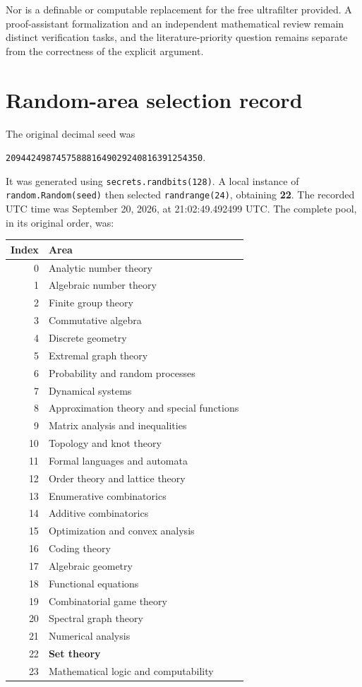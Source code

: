 \documentclass[11pt,a4paper]{article}
\theoremstyle{definition}
\theoremstyle{remark}
\begin{document}
Nor is a definable or computable replacement for the free ultrafilter
provided. A proof-assistant formalization and an independent
mathematical review remain distinct verification tasks, and the
literature-priority question remains separate from the correctness of
the explicit argument.

\clearpage
\appendix
\section{Random-area selection record}
\label{app:random}

The original decimal seed was
\begin{center}
\texttt{209442498745758881649029240816391254350}.
\end{center}
It was generated using \texttt{secrets.randbits(128)}. A local instance
of \texttt{random.Random(seed)} then selected
\texttt{randrange(24)}, obtaining \textbf{22}. The recorded UTC time was
September 20, 2026, at 21:02:49.492499 UTC. The complete pool, in its
original order, was:

\begin{center}
\small
\begin{longtable}{@{}rl@{}}
\toprule
Index & Area\\
\midrule
\endhead
0 & Analytic number theory\\
1 & Algebraic number theory\\
2 & Finite group theory\\
3 & Commutative algebra\\
4 & Discrete geometry\\
5 & Extremal graph theory\\
6 & Probability and random processes\\
7 & Dynamical systems\\
8 & Approximation theory and special functions\\
9 & Matrix analysis and inequalities\\
10 & Topology and knot theory\\
11 & Formal languages and automata\\
12 & Order theory and lattice theory\\
13 & Enumerative combinatorics\\
14 & Additive combinatorics\\
15 & Optimization and convex analysis\\
16 & Coding theory\\
17 & Algebraic geometry\\
18 & Functional equations\\
19 & Combinatorial game theory\\
20 & Spectral graph theory\\
21 & Numerical analysis\\
22 & \textbf{Set theory}\\
23 & Mathematical logic and computability\\
\bottomrule
\end{longtable}
\end{center}
\end{document}
